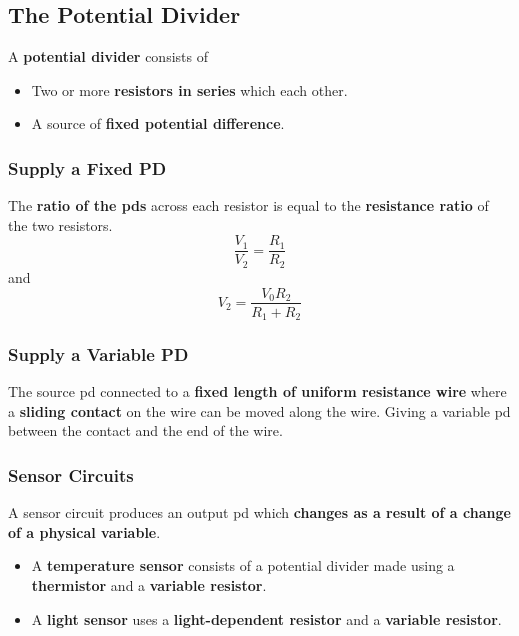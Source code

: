 \subsection{The Potential Divider}

A \textbf{potential divider} consists of
\begin{itemize}
    \item Two or more \textbf{resistors in series} which each other.
    \item A source of \textbf{fixed potential difference}.
\end{itemize}

\subsubsection*{Supply a Fixed PD}

The \textbf{ratio of the pds} across each resistor is equal to the \textbf{resistance ratio} of the two resistors.
$$\frac{V_1}{V_2}=\frac{R_1}{R_2}$$
and
$$V_2=\frac{V_0R_2}{R_1+R_2}$$

\subsubsection*{Supply a Variable PD}

The source pd connected to a \textbf{fixed length of uniform resistance wire} where a \textbf{sliding contact} on the wire can be moved along the wire. Giving a variable pd between the contact and the end of the wire.

\subsubsection*{Sensor Circuits}

A sensor circuit produces an output pd which \textbf{changes as a result of a change of a physical variable}.
\begin{itemize}
    \item A \textbf{temperature sensor} consists of a potential divider made using a \textbf{thermistor} and a \textbf{variable resistor}.
    \item A \textbf{light sensor} uses a \textbf{light-dependent resistor} and a \textbf{variable resistor}.
\end{itemize}

